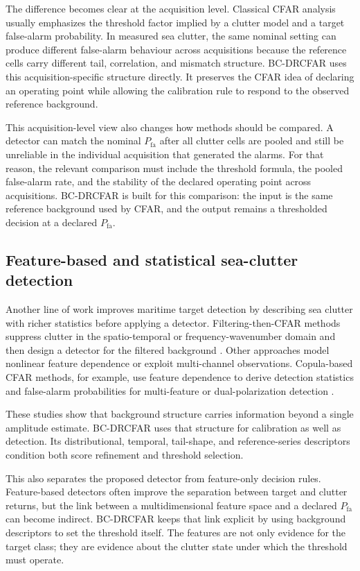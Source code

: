 \documentclass[preprint,12pt]{elsarticle}
\begin{document}
The difference becomes clear at the acquisition level. Classical CFAR analysis
usually emphasizes the threshold factor implied by a clutter model and a target
false-alarm probability. In measured sea clutter, the same nominal setting can
produce different false-alarm behaviour across acquisitions because the
reference cells carry different tail, correlation, and mismatch structure.
BC-DRCFAR uses this acquisition-specific structure directly. It preserves the
CFAR idea of declaring an operating point while allowing the calibration rule to
respond to the observed reference background.

This acquisition-level view also changes how methods should be compared. A
detector can match the nominal $P_{\mathrm{fa}}$ after all clutter cells are
pooled and still be unreliable in the individual acquisition that generated the
alarms. For that reason, the relevant comparison must include the threshold
formula, the pooled false-alarm rate, and the stability of the declared
operating point across acquisitions. BC-DRCFAR is built for this comparison: the
input is the same reference background used by CFAR, and the output remains a
thresholded decision at a declared $P_{\mathrm{fa}}$.

\subsection{Feature-based and statistical sea-clutter detection}

Another line of work improves maritime target detection by describing sea
clutter with richer statistics before applying a detector. Filtering-then-CFAR
methods suppress clutter in the spatio-temporal or frequency-wavenumber domain
and then design a detector for the filtered background
\cite{wen2022spatiotemporal,wen2024gev}. Other approaches model nonlinear
feature dependence or exploit multi-channel observations. Copula-based CFAR
methods, for example, use feature dependence to derive detection statistics and
false-alarm probabilities for multi-feature or dual-polarization detection
\cite{li2025copula,jiang2025twodcfar,fan2024fullpolarization}.

These studies show that background structure carries information beyond a single
amplitude estimate. BC-DRCFAR uses that structure for calibration as well as
detection. Its distributional, temporal, tail-shape, and reference-series
descriptors condition both score refinement and threshold selection.

This also separates the proposed detector from feature-only decision rules.
Feature-based detectors often improve the separation between target and clutter
returns, but the link between a multidimensional feature space and a declared
$P_{\mathrm{fa}}$ can become indirect. BC-DRCFAR keeps that link explicit by
using background descriptors to set the threshold itself. The features are not
only evidence for the target class; they are evidence about the clutter state
under which the threshold must operate.
\end{document}

